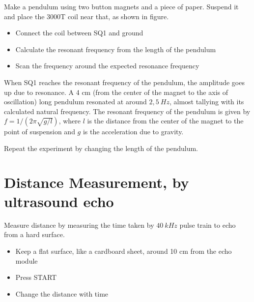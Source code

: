 \documentclass[a4paper,12pt,english]{sphinxmanual}
\let\sphinxpxdimen\pdfpxdimen\else\newdimen\sphinxpxdimen
\begin{document}

Make a pendulum using two button magnets and a piece of paper. Suspend
it and place the 3000T coil near that, as shown in figure.
\begin{itemize}
\item {} 
Connect the coil between SQ1 and ground

\item {} 
Calculate the resonant frequency from the length of the pendulum

\item {} 
Scan the frequency around the expected resonance frequency

\end{itemize}


When SQ1 reaches the resonant frequency of the pendulum, the amplitude
goes up due to resonance. A 4 cm (from the center of the magnet to the
axis of oscillation) long pendulum resonated at around \(2,5~Hz\), almost
tallying with its calculated natural frequency. The resonant frequency
of the pendulum is given by \(f = 1/(2\pi\sqrt{g/l})\), where \(l\) is the
distance from the center of the magnet to the point of suspension and \(g\)
is the acceleration due to gravity.

Repeat the experiment by changing the length of the pendulum.


\section{Distance Measurement, by ultrasound echo}
\label{\detokenize{6.4:distance-measurement-by-ultrasound-echo}}\label{\detokenize{6.4::doc}}

Measure distance by measuring the time taken by \(40~kHz\) pulse train to
echo from a hard surface.


\noindent\sphinxincludegraphics[width=300\sphinxpxdimen]{{sr04-dist}.pdf}
\begin{itemize}
\item {} 
Keep a flat surface, like a cardboard sheet, around 10 cm from the
echo module

\item {} 
Press START

\item {} 
Change the distance with time

\end{itemize}
\end{document}
